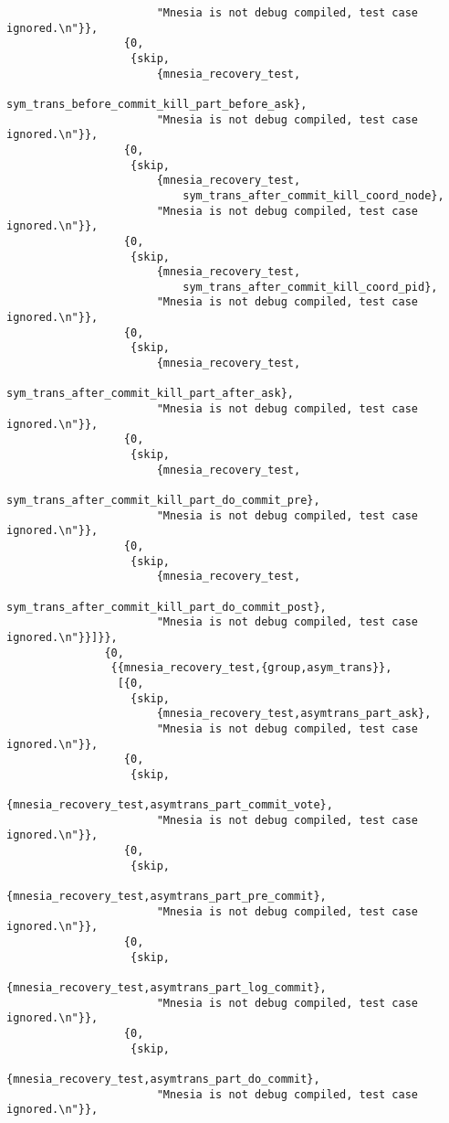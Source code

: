 \begin{verbatim}
                       "Mnesia is not debug compiled, test case ignored.\n"}},
                  {0,
                   {skip,
                       {mnesia_recovery_test,
                           sym_trans_before_commit_kill_part_before_ask},
                       "Mnesia is not debug compiled, test case ignored.\n"}},
                  {0,
                   {skip,
                       {mnesia_recovery_test,
                           sym_trans_after_commit_kill_coord_node},
                       "Mnesia is not debug compiled, test case ignored.\n"}},
                  {0,
                   {skip,
                       {mnesia_recovery_test,
                           sym_trans_after_commit_kill_coord_pid},
                       "Mnesia is not debug compiled, test case ignored.\n"}},
                  {0,
                   {skip,
                       {mnesia_recovery_test,
                           sym_trans_after_commit_kill_part_after_ask},
                       "Mnesia is not debug compiled, test case ignored.\n"}},
                  {0,
                   {skip,
                       {mnesia_recovery_test,
                           sym_trans_after_commit_kill_part_do_commit_pre},
                       "Mnesia is not debug compiled, test case ignored.\n"}},
                  {0,
                   {skip,
                       {mnesia_recovery_test,
                           sym_trans_after_commit_kill_part_do_commit_post},
                       "Mnesia is not debug compiled, test case ignored.\n"}}]}},
               {0,
                {{mnesia_recovery_test,{group,asym_trans}},
                 [{0,
                   {skip,
                       {mnesia_recovery_test,asymtrans_part_ask},
                       "Mnesia is not debug compiled, test case ignored.\n"}},
                  {0,
                   {skip,
                       {mnesia_recovery_test,asymtrans_part_commit_vote},
                       "Mnesia is not debug compiled, test case ignored.\n"}},
                  {0,
                   {skip,
                       {mnesia_recovery_test,asymtrans_part_pre_commit},
                       "Mnesia is not debug compiled, test case ignored.\n"}},
                  {0,
                   {skip,
                       {mnesia_recovery_test,asymtrans_part_log_commit},
                       "Mnesia is not debug compiled, test case ignored.\n"}},
                  {0,
                   {skip,
                       {mnesia_recovery_test,asymtrans_part_do_commit},
                       "Mnesia is not debug compiled, test case ignored.\n"}},

\end{verbatim}
